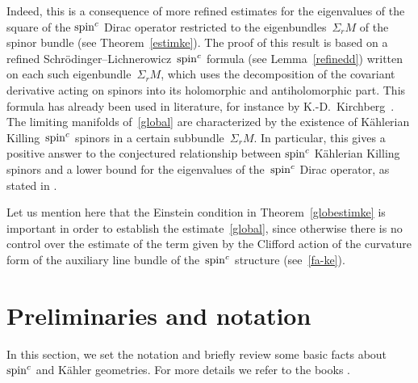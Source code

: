 \documentclass[10pt,a4paper]{amsart}
\numberwithin{equation}{section}
\theoremstyle{definition}
\begin{document}
Indeed, this is a consequence of more ref\/ined estimates for the eigenvalues of the square of the ${\mathop{\rm spin}^c}$ Dirac operator restricted to
the eigenbundles~$\Sigma_r M$ of the spinor bundle (see Theorem~\ref{estimke}).
The proof of this result is based on a ref\/ined Schr\"odinger--Lichnerowicz~${\mathop{\rm spin}^c}$ formula (see Lemma~\ref{refinedd}) written
on each such eigenbundle~$\Sigma_rM$, which uses  the decomposition of the covariant derivative acting on spinors into its holomorphic  and antiholomorphic part. This formula has already been used in literature, for instance by K.-D.~Kirchberg~\cite{kircheven}. The limiting manifolds of~\eqref{global} are characterized by the existence of  K\"ahlerian Killing~${\mathop{\rm spin}^c}$ spinors in a certain subbundle~$\Sigma_r M$. In particular, this gives a positive answer to the conjectured relationship between ${\mathop{\rm spin}^c}$ K\"ahlerian Killing spinors and a lower bound
for the eigenvalues of the~${\mathop{\rm spin}^c}$ Dirac operator, as stated in \cite[Remark~16]{hmu}.

Let us mention here that the Einstein condition in Theorem~\ref{globestimke} is important in order to establish the estimate~\eqref{global}, since otherwise there is no control over the estimate of the term given by the Clif\/ford action of the curvature form of the auxiliary line bundle of the~${\mathop{\rm spin}^c}$ structure (see~\eqref{fa-ke}).

\section{Preliminaries and notation}
In this section, we set the notation and brief\/ly review  some basic facts about ${\mathop{\rm spin}^c}$ and K\"ahler geometries.
For more details we refer to the books \cite{bookspin, fr_book,spin,am_lectures}.
\end{document}
